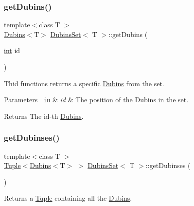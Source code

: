 \subsubsection{\texorpdfstring{getDubins()}{getDubins()}}
{\footnotesize\ttfamily template$<$class T $>$ \\
\mbox{\hyperlink{class_dubins}{Dubins}}$<$T$>$ \mbox{\hyperlink{class_dubins_set}{Dubins\+Set}}$<$ T $>$\+::get\+Dubins (\begin{DoxyParamCaption}\item[{\mbox{\hyperlink{draw_8hh_aa620a13339ac3a1177c86edc549fda9b}{int}}}]{id }\end{DoxyParamCaption})\hspace{0.3cm}{\ttfamily [inline]}}

Thid functions returns a specific {\ttfamily \mbox{\hyperlink{class_dubins}{Dubins}}} from the set. 
\begin{DoxyParams}[1]{Parameters}
\mbox{\texttt{ in}}  & {\em id} & The position of the {\ttfamily \mbox{\hyperlink{class_dubins}{Dubins}}} in the set. \\
\hline
\end{DoxyParams}
\begin{DoxyReturn}{Returns}
The id-\/th {\ttfamily \mbox{\hyperlink{class_dubins}{Dubins}}}. 
\end{DoxyReturn}
\mbox{\label{class_dubins_set_a2d0216573331d2ca6bf36ea213c4d434}} 
\subsubsection{\texorpdfstring{getDubinses()}{getDubinses()}}
{\footnotesize\ttfamily template$<$class T $>$ \\
\mbox{\hyperlink{class_tuple}{Tuple}}$<$\mbox{\hyperlink{class_dubins}{Dubins}}$<$T$>$ $>$ \mbox{\hyperlink{class_dubins_set}{Dubins\+Set}}$<$ T $>$\+::get\+Dubinses (\begin{DoxyParamCaption}{ }\end{DoxyParamCaption})\hspace{0.3cm}{\ttfamily [inline]}}



Returns a {\ttfamily \mbox{\hyperlink{class_tuple}{Tuple}}} containing all the {\ttfamily \mbox{\hyperlink{class_dubins}{Dubins}}}. 

